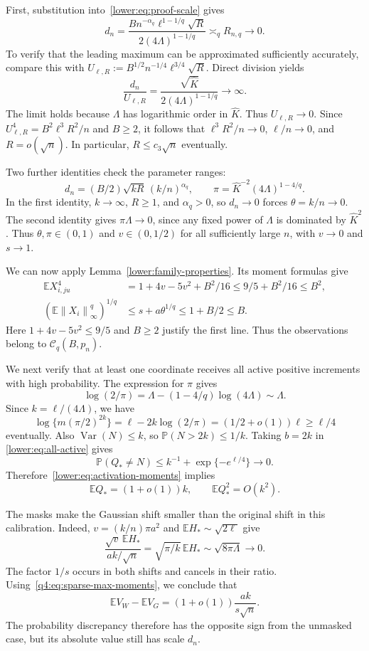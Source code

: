 \documentclass[11pt,letterpaper,twoside,leqno]{article}
\theoremstyle{bookplain}
\theoremstyle{bookremark}
\newcommand{\E}{\mathbb E}
\newcommand{\Pp}{\mathbb P}
\newcommand{\Var}{\operatorname{Var}}
\newcommand{\norm}[1]{\left\lVert#1\right\rVert}
\begin{document}
First, substitution into~\eqref{lower:eq:proof-scale} gives
\[
 d_n=\frac{B n^{-\alpha_q}\ell^{1-1/q}\sqrt R}
 {2(4\Lambda)^{1-1/q}}\asymp_q R_{n,q}\longrightarrow0.
\]
To verify that the leading maximum can be approximated sufficiently
accurately, compare this with
$U_{\ell,R}:=B^{1/2}n^{-1/4}\ell^{3/4}\sqrt R$.
Direct division yields
\[
 \frac{d_n}{U_{\ell,R}}
 =\frac{\sqrt{\widehat K}}{2(4\Lambda)^{1-1/q}}
 \longrightarrow\infty.
\]
The limit holds because $\Lambda$ has logarithmic order in
$\widehat K$. Thus $U_{\ell,R}\to0$. Since
$U_{\ell,R}^4=B^2\ell^3R^2/n$ and $B\ge2$, it follows that
$\ell^3R^2/n\to0$, $\ell/n\to0$, and $R=o(\sqrt n)$.
In particular, $R\le c_3\sqrt n$ eventually.

Two further identities check the parameter ranges:
\[
 d_n=(B/2)\sqrt{kR}\,(k/n)^{\alpha_q},\qquad
 \pi=\widehat K^{-2}(4\Lambda)^{1-4/q}.
\]
In the first identity, $k\to\infty$, $R\ge1$, and
$\alpha_q>0$, so $d_n\to0$ forces $\theta=k/n\to0$.
The second identity gives $\pi\Lambda\to0$, since any fixed
power of $\Lambda$ is dominated by $\widehat K^2$.
Thus $\theta,\pi\in(0,1)$ and $v\in(0,1/2)$ for all
sufficiently large $n$, with $v\to0$ and $s\to1$.

We can now apply Lemma~\ref{lower:family-properties}. Its moment
formulas give
\begin{align}
 \E X_{i,ju}^4
 &=1+4v-5v^2+B^2/16\le9/5+B^2/16\le B^2,
 \label{q4:eq:sparse-coordinate-moments}\\
 (\E\norm{X_i}_\infty^q)^{1/q}
 &\le s+a\theta^{1/q}\le1+B/2\le B.
 \label{q4:eq:sparse-envelope-moment}
\end{align}
Here $1+4v-5v^2\le9/5$ and $B\ge2$ justify the first line.
Thus the observations belong to $\mathcal C_q(B,p_n)$.

We next verify that at least one coordinate receives all active
positive increments with high probability. The expression for $\pi$
gives
\[
 \log(2/\pi)=\Lambda-(1-4/q)\log(4\Lambda)\sim\Lambda.
\]
Since $k=\ell/(4\Lambda)$, we have
\[
 \log\{m(\pi/2)^{2k}\}
 =\ell-2k\log(2/\pi)=(1/2+o(1))\ell\ge\ell/4
\]
eventually. Also $\Var(N)\le k$, so
$\Pp(N>2k)\le1/k$. Taking $b=2k$ in
\eqref{lower:eq:all-active} gives
\[
 \Pp(Q_*\ne N)\le k^{-1}+\exp\{-e^{\ell/4}\}\to0.
\]
Therefore~\eqref{lower:eq:activation-moments} implies
\begin{equation}
 \E Q_*=(1+o(1))k,\qquad \E Q_*^2=O(k^2).
 \label{q4:eq:sparse-max-moments}
\end{equation}

The masks make the Gaussian shift smaller than the original shift
in this calibration. Indeed, $v=(k/n)\pi a^2$ and
$\E H_*\sim\sqrt{2\ell}$ give
\[
 \frac{\sqrt v\,\E H_*}{ak/\sqrt n}
 =\sqrt{\pi/k}\,\E H_*\sim\sqrt{8\pi\Lambda}\to0.
\]
The factor $1/s$ occurs in both shifts and cancels in their ratio.
Using~\eqref{q4:eq:sparse-max-moments}, we conclude that
\begin{equation}
 \E V_W-\E V_G=(1+o(1))\frac{ak}{s\sqrt n}.
 \label{q4:eq:sparse-mean-gap}
\end{equation}
The probability discrepancy therefore has the opposite sign from
the unmasked case, but its absolute value still has scale $d_n$.
\end{document}
